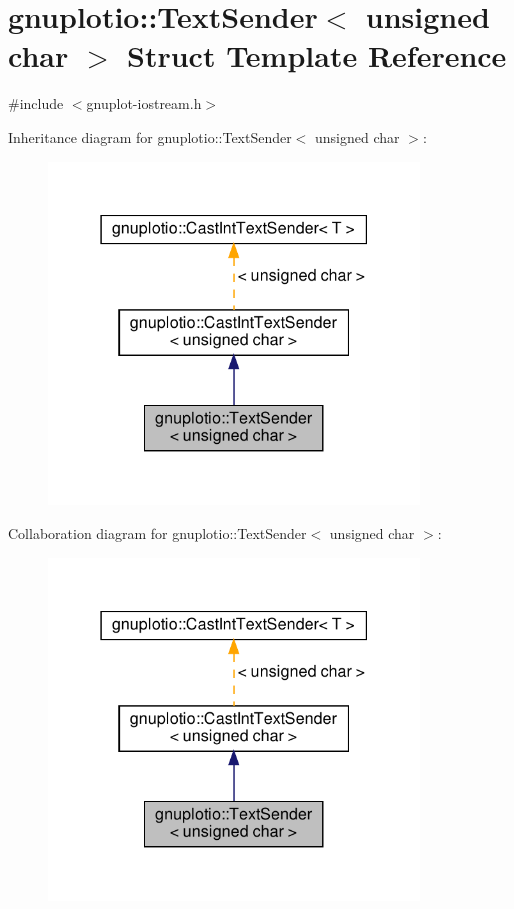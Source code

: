 \hypertarget{structgnuplotio_1_1_text_sender_3_01unsigned_01char_01_4}{}\section{gnuplotio\+:\+:Text\+Sender$<$ unsigned char $>$ Struct Template Reference}
\label{structgnuplotio_1_1_text_sender_3_01unsigned_01char_01_4}


{\ttfamily \#include $<$gnuplot-\/iostream.\+h$>$}



Inheritance diagram for gnuplotio\+:\+:Text\+Sender$<$ unsigned char $>$\+:
\nopagebreak
\begin{figure}[H]
\begin{center}
\leavevmode
\includegraphics[width=279pt]{structgnuplotio_1_1_text_sender_3_01unsigned_01char_01_4__inherit__graph}
\end{center}
\end{figure}


Collaboration diagram for gnuplotio\+:\+:Text\+Sender$<$ unsigned char $>$\+:
\nopagebreak
\begin{figure}[H]
\begin{center}
\leavevmode
\includegraphics[width=279pt]{structgnuplotio_1_1_text_sender_3_01unsigned_01char_01_4__coll__graph}
\end{center}
\end{figure}
